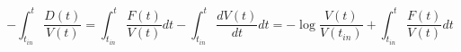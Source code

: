 \begin{equation}
-\int_{t_{in}}^t \frac{D(t)}{V(t)}=\int_{t_{in}}^t \frac{F(t)}{V(t)} dt - \int_{t_{in}}^t \frac{dV(t)}{dt} dt = -\log \frac{V(t)}{V(t_{in})}+ \int_{t_{in}}^t \frac{F(t)}{V(t)} dt
\end{equation}